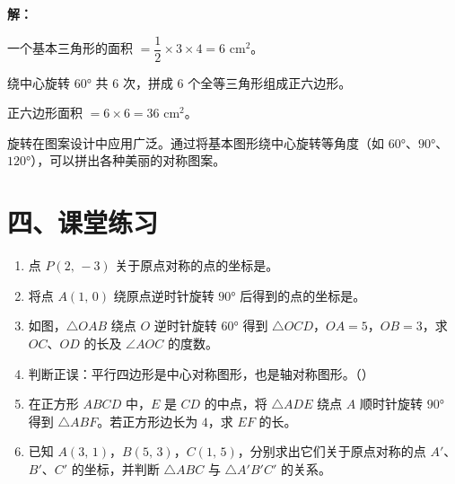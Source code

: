 \documentclass[12pt, a4paper]{ctexart}
\begin{document}
\textbf{解：}

一个基本三角形的面积 $= \dfrac{1}{2} \times 3 \times 4 = 6$ cm$^2$。

绕中心旋转 $60°$ 共 $6$ 次，拼成 $6$ 个全等三角形组成正六边形。

正六边形面积 $= 6 \times 6 = 36$ cm$^2$。

\begin{tipbox}[方法总结]
旋转在图案设计中应用广泛。通过将基本图形绕中心旋转等角度（如 $60°$、$90°$、$120°$），可以拼出各种美丽的对称图案。
\end{tipbox}

\section*{\textcolor{tipgreen}{四、课堂练习}}

\begin{enumerate}
  \item 点 $P(2,\, -3)$ 关于原点对称的点的坐标是\blank{3cm}。

  \item 将点 $A(1,\, 0)$ 绕原点逆时针旋转 $90°$ 后得到的点的坐标是\blank{3cm}。

  \item 如图，$\triangle OAB$ 绕点 $O$ 逆时针旋转 $60°$ 得到 $\triangle OCD$，$OA = 5$，$OB = 3$，求 $OC$、$OD$ 的长及 $\angle AOC$ 的度数。

  \item 判断正误：平行四边形是中心对称图形，也是轴对称图形。（\quad）

  \item 在正方形 $ABCD$ 中，$E$ 是 $CD$ 的中点，将 $\triangle ADE$ 绕点 $A$ 顺时针旋转 $90°$ 得到 $\triangle ABF$。若正方形边长为 $4$，求 $EF$ 的长。

  \item 已知 $A(3,\, 1)$，$B(5,\, 3)$，$C(1,\, 5)$，分别求出它们关于原点对称的点 $A'$、$B'$、$C'$ 的坐标，并判断 $\triangle ABC$ 与 $\triangle A'B'C'$ 的关系。
\end{enumerate}

\vspace{10pt}
\end{document}

